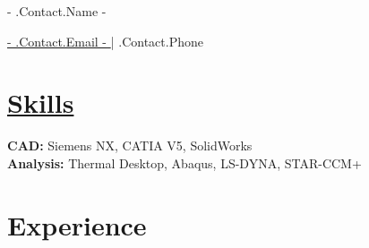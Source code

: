 \documentclass[10pt,letterpaper]{article}
\begin{document}

\centerline{\Huge { {{- .Contact.Name -}} }}

\vspace{5pt}


\centerline{\href{mailto:{{.Contact.Email -}} }{ {{- .Contact.Email -}} } | {{.Contact.Phone}} }

\vspace{-10pt}


\section*{\href{https://www.reddit.com/r/EngineeringResumes/wiki/index\#wiki_skills}{Skills}}
\textbf{CAD:} Siemens NX, CATIA V5, SolidWorks \\
\textbf{Analysis:} Thermal Desktop, Abaqus, LS-DYNA, STAR-CCM+

\vspace{-6.5pt}


\section*{Experience}
\end{document}
